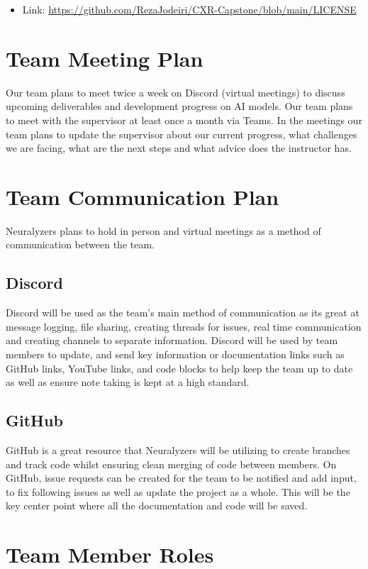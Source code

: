 \documentclass{article}
\begin{document}
\begin{itemize}
    \item Link: \url{https://github.com/RezaJodeiri/CXR-Capstone/blob/main/LICENSE}
\end{itemize}

\section{Team Meeting Plan}

Our team plans to meet twice a week on Discord (virtual meetings) to discuss upcoming deliverables and development progress on AI models. 
Our team plans to meet with the supervisor at least once a month via Teams. In the meetings our team plans to update the supervisor about our current progress, what challenges we are facing, what are the next steps and what advice does the instructor has. 


\section{Team Communication Plan}

Neuralyzers plans to hold in person and virtual meetings as a method of communication between the team. 

\subsection{Discord}
Discord will be used as the team's main method of communication as its great at message logging, file sharing, creating threads for issues, real time communication and creating channels to separate information. Discord will be used by team members to update, and send key information or documentation links such as GitHub links, YouTube links, and code blocks to help keep the team up to date as well as ensure note taking is kept at a high standard. 
\subsection{GitHub}
GitHub is a great resource that Neuralyzers will be utilizing to create branches and track code whilst ensuring clean merging of code between members. On GitHub, issue requests can be created for the team to be notified and add input, to fix following issues as well as update the project as a whole. This will be the key center point where all the documentation and code will be saved. 

\section{Team Member Roles}
\end{document}
